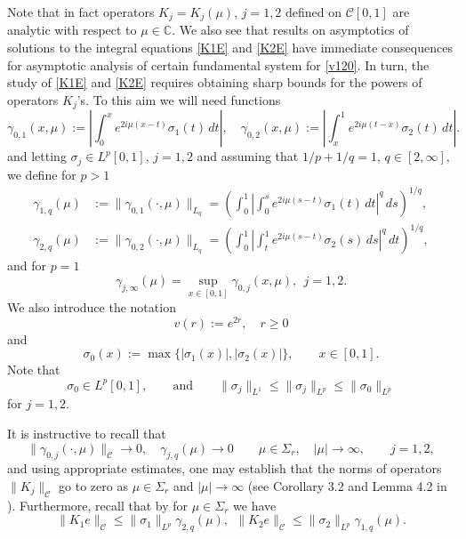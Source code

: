 \documentclass[11pt]{amsart}
\theoremstyle{plain}
\theoremstyle{definition}
\theoremstyle{remark}
\numberwithin{equation}{section}
\begin{document}
Note that in fact operators $K_j=K_j(\mu)$, $j=1,2$ defined on $\mathcal{C}[0,1]$ are analytic with respect to $\mu \in \mathbb{C}$.
We also see that  results on asymptotics of solutions to the integral equations
\eqref{K1E} and \eqref{K2E} have immediate consequences for
asymptotic analysis of
certain fundamental system for \eqref{v120}.
In turn, the study of \eqref{K1E} and \eqref{K2E} requires obtaining sharp bounds for the
powers of operators $K_j$'s. To this aim we will need
functions
\begin{equation}\label{Dgamma0}
\gamma_{0,1}(x,\mu):=\left|\int_0^x e^{2i\mu(x-t)}\sigma_1(t)\,dt\right|,
\quad \gamma_{0,2}(x,\mu):=\left|\int_x^1 e^{2i\mu(t-x)}\sigma_2(t)\,dt\right|.
\end{equation}
and letting $\sigma_j\in L^p[0,1]$, $j=1,2$ and assuming that
$1/p+1/q=1$, $q\in [2,\infty],$
we  define for $p>1$
\begin{align}\label{Dgamma}
\gamma_{1,q}(\mu)&:=\|\gamma_{0,1}(\cdot,\mu)\|_{L_q}=
\left(\int_0^1 \left|\int_0^s e^{2i\mu(s-t)}
\sigma_1(t)\,dt\right|^q \,ds\right)^{1/q},\\
\gamma_{2,q}(\mu)&:=\|\gamma_{0,2}(\cdot,\mu)\|_{L_q}=
\left(\int_0^1\left|\int_t^1 e^{2i\mu(s-t)}
\sigma_2(s)\,ds\right|^q\,dt\right)^{1/q},\nonumber
\end{align}
and for $p=1$
\begin{equation}\label{DgammaInf}
\gamma_{j,\infty}(\mu)=\sup_{x\in [0,1]}\gamma_{0,j}(x,\mu), \ \  j=1,2.
\end{equation}
We also introduce the notation
\[
v(r):=e^{2r},\quad r\ge 0
\]
and
\begin{equation}\label{sigma}
\sigma_0(x):=\max\{|\sigma_1(x)|, |\sigma_2(x)|\}, \qquad x \in [0,1].
\end{equation}
Note that
\[\sigma_0 \in L^p[0,1], \qquad \text{and}\qquad
\|\sigma_j\|_{L^1}\le \|\sigma_j\|_{L^p}\le \|\sigma_0\|_{L^p}
\]
for $j=1,2$.

It is instructive to recall that
\[
\|\gamma_{0,j}(\cdot,\mu)\|_{\mathcal C}\to 0,\quad \gamma_{j,q}(\mu)\to 0 \qquad \mu\in \Sigma_r,\quad |\mu|\to\infty, \qquad j=1,2,
\]
and using appropriate estimates, one may establish that the norms of operators $\|K_j\|_\mathcal{C}$ go to zero as
$\mu \in \Sigma_r$ and $|\mu| \to \infty$
(see Corollary 3.2 and Lemma 4.2 in \cite{Rzep25}).
Furthermore, recall that by \cite[Lemma 4.1]{Rzep25} for $\mu \in \Sigma_r$ we have
\begin{equation}\label{Ae}
\|K_1e\|_\mathcal{C}\le \|\sigma_1\|_{L^p}\gamma_{2,q}(\mu), \ \ \|K_2e\|_\mathcal{C}\le \|\sigma_2\|_{L^p}\gamma_{1,q}(\mu).
\end{equation}
\end{document}
